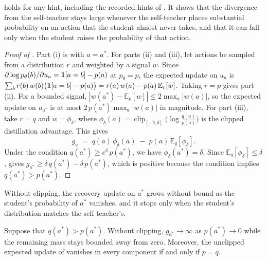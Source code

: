  holds for any hint, including the recorded hints of . It shows that the divergence from the self-teacher stays large whenever the self-teacher places substantial probability on an action that the student almost never takes, and that it can fall only when the student raises the probability of that action.

\begin{proof}[Proof of ]
Part (i) is  with $a = a^{*}$. For parts (ii) and (iii), let actions be sampled from a distribution $r$ and weighted by a signal $w$. Since $\partial \log p_\theta(b) / \partial u_a = \bm{1}[a = b] - p(a)$ at $p_\theta = p$, the expected update on $u_a$ is $\sum_b r(b)\, w(b) \bigl(\bm{1}[a = b] - p(a)\bigr) = r(a)\, w(a) - p(a)\, \mathbb{E}_r[w]$. Taking $r = p$ gives part (ii). For a bounded signal, $|w(a^{*}) - \mathbb{E}_p[w]| \le 2 \max_a |w(a)|$, so the expected update on $u_{a^{*}}$ is at most $2\, p(a^{*}) \max_a |w(a)|$ in magnitude. For part (iii), take $r = q$ and $w = \phi_\delta$, where $\phi_\delta(a) = \operatorname{clip}_{[-\delta,\delta]}\bigl(\log\tfrac{q(a)}{p(a)}\bigr)$ is the clipped distillation advantage. This gives
\begin{equation}
g_a \;=\; q(a)\,\phi_\delta(a) \;-\; p(a)\,\mathbb{E}_{q}\!\left[\phi_\delta\right].
\label{eq:recovery_coords}
\end{equation}
Under the condition $q(a^{*}) \ge e^{\delta}\, p(a^{*})$, we have $\phi_\delta(a^{*}) = \delta$. Since $\mathbb{E}_q[\phi_\delta] \le \delta$,  gives $g_{a^{*}} \ge \delta\, q(a^{*}) - \delta\, p(a^{*})$, which is positive because the condition implies $q(a^{*}) > p(a^{*})$.
\end{proof}


Without clipping, the recovery update on $a^{*}$ grows without bound as the student's probability of $a^{*}$ vanishes, and it stops only when the student's distribution matches the self-teacher's.

\begin{lemma}
\label{lem:unclipped}
Suppose that $q(a^{*}) > p(a^{*})$. Without clipping, $g_{a^{*}} \to \infty$ as $p(a^{*}) \to 0$ while the remaining mass stays bounded away from zero. Moreover, the unclipped expected update of  vanishes in every component if and only if $p = q$.
\end{lemma}

